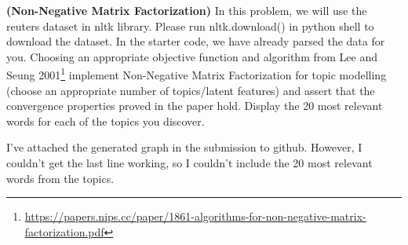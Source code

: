 \documentclass[12pt,letterpaper,fleqn]{hmcpset}
\begin{document}
\begin{problem}
\textbf{(Non-Negative Matrix Factorization)} 
In this problem, we will use the reuters dataset in nltk library. Please run nltk.download() in python shell to download the dataset. In the starter code, we have already parsed the data for you. 
\newline
\newline
Choosing an appropriate
objective function and algorithm from Lee and Seung 2001\footnote{\url{https://papers.nips.cc/paper/1861-algorithms-for-non-negative-matrix-factorization.pdf}}
implement Non-Negative Matrix Factorization for topic modelling (choose an appropriate number
of topics/latent features) and assert that the convergence properties proved in the paper hold. 
Display the 20 most relevant words for each of the topics you discover.
\end{problem}
\begin{solution}
I've attached the generated graph in the submission to github. However, I couldn't get the last line working, so I couldn't include the 20 most relevant words from the topics. 
\end{solution}
\end{document}
